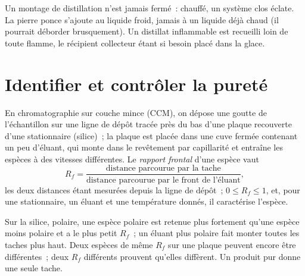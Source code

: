 \begin{safety}{}
Un montage de distillation n'est jamais fermé~: chauffé, un système
clos éclate. La pierre ponce s'ajoute au liquide froid, jamais à un
liquide déjà chaud (il pourrait déborder brusquement). Un distillat
inflammable est recueilli loin de toute flamme, le récipient collecteur
étant si besoin placé dans la glace.
\end{safety}

\section{Identifier et contrôler la pureté}

\begin{definition}\label{def:b1:lab-techniques-1:retention-factor}
En chromatographie sur couche mince (CCM), on dépose une goutte de
l'échantillon sur une ligne de dépôt tracée près du bas d'une plaque
recouverte d'une  stationnaire (silice)~; la plaque est placée dans
une cuve fermée contenant un peu d'éluant, qui monte dans le revêtement
par capillarité et entraîne les espèces à des vitesses différentes. Le
\emph{rapport frontal} d'une espèce vaut
\[
  R_f = \frac{\text{distance parcourue par la tache}}
             {\text{distance parcourue par le front de l'éluant}},
\]
les deux distances étant mesurées depuis la ligne de dépôt~;
$0 \le R_f \le 1$, et, pour une  stationnaire, un éluant et une
température donnés, il caractérise l'espèce.
\end{definition}

Sur la silice, polaire, une espèce polaire est retenue plus fortement
qu'une espèce moins polaire et a le plus petit $R_f$~; un éluant plus
polaire fait monter toutes les taches plus haut. Deux espèces de même
$R_f$ sur une plaque peuvent encore être différentes~; deux $R_f$
différents prouvent qu'elles diffèrent. Un produit pur donne une seule
tache.

